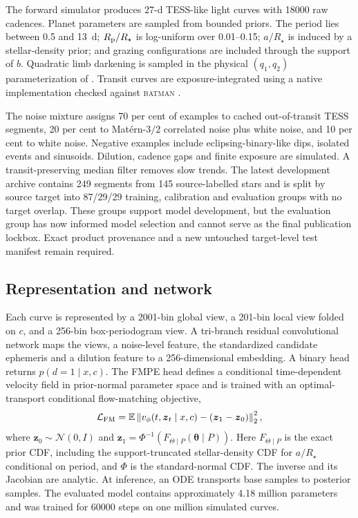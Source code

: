 \documentclass[fleqn,usenatbib]{mnras}
\begin{document}
The forward simulator produces 27-d TESS-like light curves with 18000 raw
cadences. Planet parameters are sampled from bounded priors. The period lies
between 0.5 and 13~d; $R_{\rm p}/R_\star$ is log-uniform over 0.01--0.15;
$a/R_\star$ is induced by a stellar-density prior; and grazing configurations
are included through the support of $b$. Quadratic limb darkening is sampled in
the physical $(q_1,q_2)$ parameterization of \citet{Kipping2013}. Transit curves
are exposure-integrated using a native implementation checked against
\textsc{batman} \citep{Kreidberg2015}.

The noise mixture assigns 70 per cent of examples to cached out-of-transit TESS
segments, 20 per cent to Mat\'ern-$3/2$ correlated noise plus white noise, and
10 per cent to white noise. Negative examples include eclipsing-binary-like
dips, isolated events and sinusoids. Dilution, cadence gaps and finite exposure
are simulated. A transit-preserving median filter removes slow trends. The
latest development archive contains 249 segments from 145 source-labelled
stars and is split by source target into 87/29/29 training, calibration and
evaluation groups with no target overlap. These groups support model
development, but the evaluation group has now informed model selection and
cannot serve as the final publication lockbox. Exact product provenance and a
new untouched target-level test manifest remain required.

\subsection{Representation and network}

Each curve is represented by a 2001-bin global view, a 201-bin local view folded
on $c$, and a 256-bin box-periodogram view. A tri-branch residual convolutional
network maps the views, a noise-level feature, the standardized candidate
ephemeris and a dilution feature to a 256-dimensional embedding. A binary head
returns $p(d=1\mid x,c)$. The FMPE head defines a conditional time-dependent
velocity field in prior-normal parameter space and is trained with an
optimal-transport conditional flow-matching objective,
\begin{equation}
 \mathcal{L}_{\rm FM} = \mathbb{E}
 \left\lVert v_\phi(t,\boldsymbol{z}_t\mid x,c) -
 (\boldsymbol{z}_1-\boldsymbol{z}_0)\right\rVert_2^2,
\end{equation}
where $\boldsymbol{z}_0\sim\mathcal{N}(0,I)$ and
$\boldsymbol{z}_1=\Phi^{-1}(F_{\Theta\mid P}(\boldsymbol{\theta}\mid P))$.
Here $F_{\Theta\mid P}$ is the exact prior CDF, including the support-truncated
stellar-density CDF for $a/R_\star$ conditional on period, and $\Phi$ is the
standard-normal CDF. The inverse and its Jacobian are analytic. At inference,
an ODE transports base samples to posterior samples. The evaluated model contains
approximately 4.18 million parameters and was trained for 60000 steps on one
million simulated curves.
\end{document}
